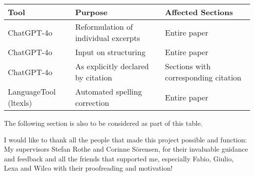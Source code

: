 \begin{table}[H]
    \begin{tabular}{lll}
        Tool & Purpose & Affected Sections \\ \hline
        ChatGPT-4o & Reformulation of individual excerpts & Entire paper \\
        ChatGPT-4o & Input on structuring & Entire paper \\
        ChatGPT-4o & As explicitly declared by citation & Sections with corresponding citation \\
        LanguageTool (ltexls) & Automated spelling correction & Entire paper \\
    \end{tabular}

\end{table}
The following section is also to be considered as part of this table.

\begingroup
\renewcommand{\cleardoublepage}{}
\renewcommand{\clearpage}{}
\label{chap:ack}
\endgroup
I would like to thank all the people that made this project possible and function: My supervisors Stefan Rothe and Corinne Sörensen, for their invaluable guidance and feedback and all the friends that supported me, especially Fabio, Giulio, Lexa and Wilco with their proofreading and motivation!
